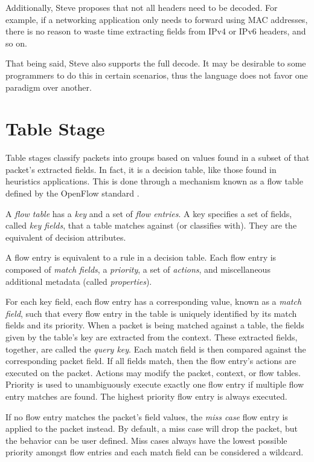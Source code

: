 Additionally, Steve proposes that not all headers need to be decoded. For
example, if a networking application only needs to forward using MAC addresses,
there is no reason to waste time extracting fields from IPv4 or IPv6 headers,
and so on.

That being said, Steve also supports the full decode. It may be desirable to
some programmers to do this in certain scenarios, thus the language does not
favor one paradigm over another.

\section{Table Stage} \label{table_desc}

Table stages classify packets into groups based on values found in a subset of
that packet's extracted fields. In fact, it is a decision table, like those
found in heuristics applications. This is done through a mechanism known as a
flow table defined by the OpenFlow standard \cite{openflow_spec}.

A \textit{flow table} has a \textit{key} and a set of \textit{flow entries}. A
key specifies a set of fields, called \textit{key fields}, that a table matches
against (or classifies with). They are the equivalent of decision attributes.

A flow entry is equivalent to a rule in a decision table. Each flow entry is
composed of \textit{match fields}, a \textit{priority}, a set of
\textit{actions}, and miscellaneous additional metadata (called
\textit{properties}).

For each key field, each flow entry has a corresponding value, known as a
\textit{match field}, such that every flow entry in the table is uniquely
identified by its match fields and its priority. When a packet is being matched
against a table, the fields given by the table's key are extracted from the
context. These extracted fields, together, are called the \textit{query key}.
Each match field is then compared against the corresponding packet field. If all
fields match, then the flow entry's actions are executed on the packet. Actions
may modify the packet, context, or flow tables. Priority is used to
unambiguously execute exactly one flow entry if multiple flow entry matches are
found. The highest priority flow entry is always executed.

If no flow entry matches the packet's field values, the \textit{miss case} flow
entry is applied to the packet instead. By default, a miss case will drop the
packet, but the behavior can be user defined. Miss cases always have the lowest
possible priority amongst flow entries and each match field can be considered a
wildcard.

